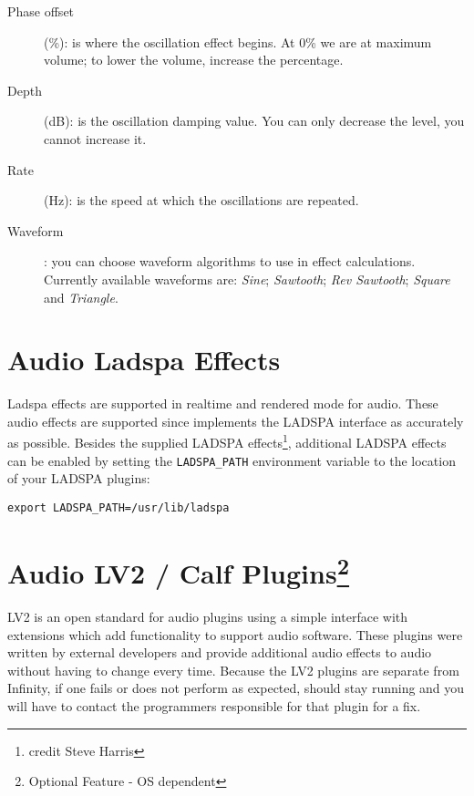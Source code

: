 \begin{description}
	\item[Phase offset] (\%): is where the oscillation effect begins. At 0\% we are at maximum volume; to lower the volume, increase the percentage.
	\item[Depth] (dB): is the oscillation damping value. You can only decrease the level, you cannot increase it.
	\item[Rate] (Hz): is the speed at which the oscillations are repeated.
	\item[Waveform]: you can choose waveform algorithms to use in effect calculations.
Currently available waveforms are: \textit{Sine}; \textit{Sawtooth}; \textit{Rev Sawtooth}; \textit{Square} and \textit{Triangle}.
\end{description}

\section{Audio Ladspa Effects}%
\label{sec:audio_ladspa_effects}

Ladspa effects are supported in realtime and rendered mode for audio. These audio effects are supported since \CGG{} implements the LADSPA interface as accurately as possible. Besides the supplied LADSPA effects\protect\footnote{credit Steve Harris}, additional LADSPA effects can be enabled by setting the \texttt{LADSPA\_PATH} environment variable to the location of your LADSPA plugins:

\begin{lstlisting}[style=sh]
export LADSPA_PATH=/usr/lib/ladspa
\end{lstlisting}

\section[Audio LV2 / Calf Plugins]{Audio LV2 / Calf Plugins\protect\footnote{Optional Feature - OS dependent}}%
\label{sec:audio_lv2_calf_plugins}

LV2 is an open standard for audio plugins using a simple interface with extensions which add functionality to support audio software. These plugins were written by external developers and provide additional audio effects to \CGG{} audio without having to change \CGG{} every time. Because the LV2 plugins are separate from \CGG{} Infinity, if one fails or does not perform as expected, \CGG{} should stay running and you will have to contact the programmers responsible for that plugin for a fix.

